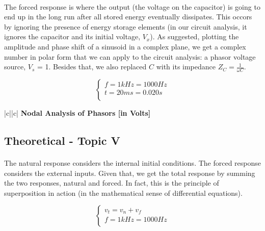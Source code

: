 \paragraph{}
The forced response is where the output (the voltage on the capacitor) is going to end up in the long run after all stored energy eventually dissipates. This occors by ignoring the presence of energy storage elements (in our circuit analysis, it ignores the capacitor and its initial voltage, $V_x$). As suggested, plotting the amplitude and phase shift of a sinusoid in a complex plane, we get a complex number in polar form that we can apply to the circuit analysis: a phasor voltage source, $V_s$ = 1. Besides that, we also replaced $C$ with its impedance $Z_C=\frac{1}{\omega C}$.


\[
\left\{\begin{matrix}
f = 1 kHz = 1000 Hz \\
t = 20 ms = 0.020 s \\
\end{matrix}\right.
\]


\begin{center}
   \begin{tabular}{|c||c|}
      \hline    
       {\bf Nodal Analysis of Phasors [in Volts]} \\
      \hline
        
   \end{tabular}
 \end{center}
 
\subsection{Theoretical - Topic V}
\label{subsec:fifth_topic}

\paragraph{}
The natural response considers the internal initial conditions. The forced response considers the external inputs. Given that, we get the total response by summing the two responses, natural and forced. In fact, this is the principle of superposition in action (in the mathematical sense of differential equations).

\[
\left\{\begin{matrix}
v_t=v_n+v_f\\
f = 1 kHz = 1000 Hz \\
\end{matrix}\right.
\]

